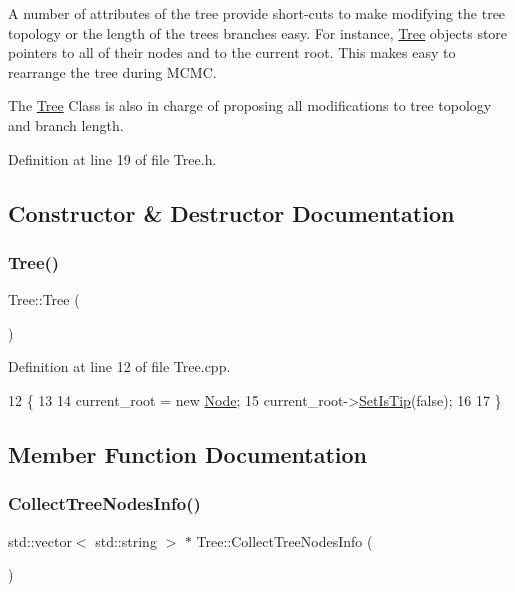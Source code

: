 A number of attributes of the tree provide short-\/cuts to make modifying the tree topology or the length of the tree\textquotesingle{}s branches easy. For instance, \hyperlink{classTree}{Tree} objects store pointers to all of their nodes and to the current root. This makes easy to rearrange the tree during M\+C\+MC.

The \hyperlink{classTree}{Tree} Class is also in charge of proposing all modifications to tree topology and branch length. 

Definition at line 19 of file Tree.\+h.



\subsection{Constructor \& Destructor Documentation}
\mbox{\label{classTree_ad376a7c639d857312f5de2ef47482f68}} 
\subsubsection{\texorpdfstring{Tree()}{Tree()}}
{\footnotesize\ttfamily Tree\+::\+Tree (\begin{DoxyParamCaption}{ }\end{DoxyParamCaption})}



Definition at line 12 of file Tree.\+cpp.


\begin{DoxyCode}
12           \{
13   
14   current\_root =  \textcolor{keyword}{new} \hyperlink{classNode}{Node};
15   current\_root->\hyperlink{classNode_a89bff92e3930d521439395ccf332418f}{SetIsTip}(\textcolor{keyword}{false});
16   
17 \}
\end{DoxyCode}


\subsection{Member Function Documentation}
\mbox{\label{classTree_a369b39fd2a571e0c4dfdadbdf4364c07}} 
\subsubsection{\texorpdfstring{Collect\+Tree\+Nodes\+Info()}{CollectTreeNodesInfo()}}
{\footnotesize\ttfamily std\+::vector$<$ std\+::string $>$ $\ast$ Tree\+::\+Collect\+Tree\+Nodes\+Info (\begin{DoxyParamCaption}{ }\end{DoxyParamCaption})}

